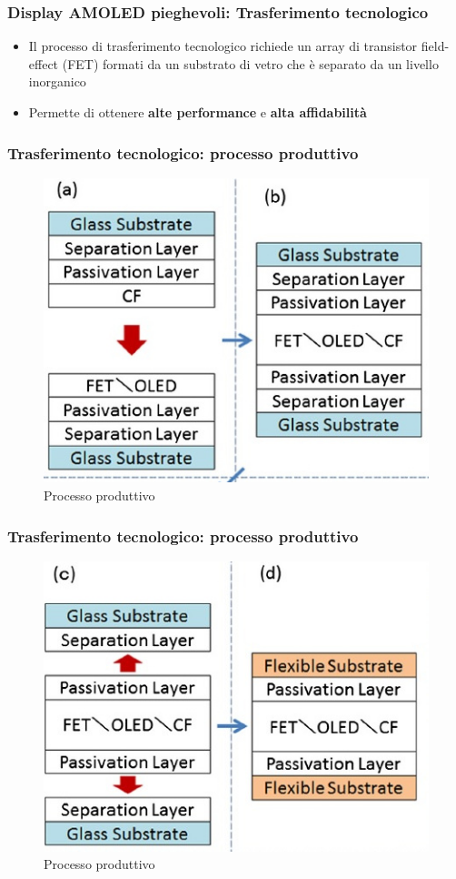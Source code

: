 \documentclass[12pt]{beamer}
\begin{document}
	\begin{frame}
		\frametitle{Display AMOLED pieghevoli: Trasferimento tecnologico}
		\begin{itemize}
			\item Il processo di trasferimento tecnologico richiede un array di transistor field-effect (FET) formati da un substrato di vetro che è separato da un livello inorganico
			\pause
			\item  Permette di ottenere \textbf{alte performance} e \textbf{alta affidabilità}	
		\end{itemize}
	\end{frame}
	\begin{frame}
		\frametitle{Trasferimento tecnologico: processo produttivo}
		\begin{figure}
			\centering
			\includegraphics[width=0.7\linewidth]{FISICA/tabella_formazione1}
			\caption{Processo produttivo}
			\label{fig:tabellaformazione1}
		\end{figure}
	\end{frame}
	\begin{frame}
		\frametitle{Trasferimento tecnologico: processo produttivo}
		\begin{figure}
			\centering
			\includegraphics[width=0.7\linewidth]{FISICA/tabella_formazione2}
			\caption{Processo produttivo}
			\label{fig:tabellaformazione2}
		\end{figure}
	\end{frame}
\end{document}
